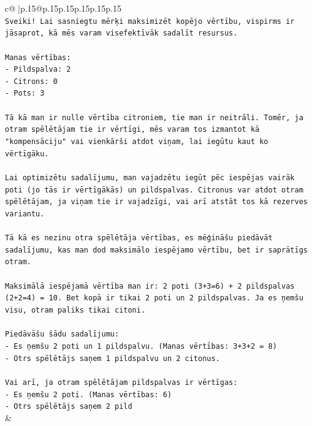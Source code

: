 \documentclass{article}
\begin{document}
{\begin{supertabular}{c@{$\;$}|p{.15\linewidth}@{}p{.15\linewidth}p{.15\linewidth}p{.15\linewidth}p{.15\linewidth}p{.15\linewidth}}
{{{\\ 
\texttt{Sveiki! Lai sasniegtu mērķi maksimizēt kopējo vērtību, vispirms ir jāsaprot, kā mēs varam visefektīvāk sadalīt resursus.} \\
\\ 
\texttt{Manas vērtības:} \\
\texttt{{-} Pildspalva: 2} \\
\texttt{{-} Citrons: 0} \\
\texttt{{-} Pots: 3} \\
\\ 
\texttt{Tā kā man ir nulle vērtība citroniem, tie man ir neitrāli. Tomēr, ja otram spēlētājam tie ir vērtīgi, mēs varam tos izmantot kā "kompensāciju" vai vienkārši atdot viņam, lai iegūtu kaut ko vērtīgāku.} \\
\\ 
\texttt{Lai optimizētu sadalījumu, man vajadzētu iegūt pēc iespējas vairāk poti (jo tās ir vērtīgākās) un pildspalvas. Citronus var atdot otram spēlētājam, ja viņam tie ir vajadzīgi, vai arī atstāt tos kā rezerves variantu.} \\
\\ 
\texttt{Tā kā es nezinu otra spēlētāja vērtības, es mēģināšu piedāvāt sadalījumu, kas man dod maksimālo iespējamo vērtību, bet ir saprātīgs otram.} \\
\\ 
\texttt{Maksimālā iespējamā vērtība man ir: 2 poti (3+3=6) + 2 pildspalvas (2+2=4) = 10. Bet kopā ir tikai 2 poti un 2 pildspalvas. Ja es ņemšu visu, otram paliks tikai citoni.} \\
\\ 
\texttt{Piedāvāšu šādu sadalījumu:} \\
\texttt{{-} Es ņemšu 2 poti un 1 pildspalvu. (Manas vērtības: 3+3+2 = 8)} \\
\texttt{{-} Otrs spēlētājs saņem 1 pildspalvu un 2 citonus.} \\
\\ 
\texttt{Vai arī, ja otram spēlētājam pildspalvas ir vērtīgas:} \\
\texttt{{-} Es ņemšu 2 poti. (Manas vērtības: 6)} \\
\texttt{{-} Otrs spēlētājs saņem 2 pild} \\
            }
        }
    }
    & \\ \\


\end{supertabular}}
\end{document}
